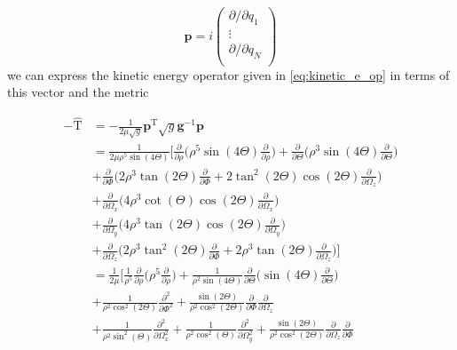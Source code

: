 \documentclass{article}
\numberwithin{equation}{section}
\numberwithin{figure}{section}
\begin{document}
\begin{equation}
\mathbf{p} = i 
\begin{pmatrix}
\partial/\partial q_1\\
\vdots\\
\partial/\partial q_N\\
\end{pmatrix}
\end{equation}
we can express the kinetic energy operator given in \eqref{eq:kinetic_e_op} in terms of this vector and the metric

\begin{equation}
\begin{aligned}
-\hat{\mathrm{T}} &= -\frac{1}{2\mu \sqrt{g}} \mathbf{p}^\mathrm{T} \sqrt{g} \mathbf{g}^{-1} \mathbf{p}\\
&= \frac{1}{2\mu \rho^5 \sin(4\Theta)}\Bigg[ \frac{\partial}{\partial \rho} \Bigg(\rho^5 \sin(4 \Theta) \frac{\partial}{\partial \rho}\Bigg) + \frac{\partial}{\partial \Theta}\Bigg(\rho^3\sin(4\Theta)\frac{\partial}{\partial\Theta}\Bigg)\\ &+\frac{\partial}{\partial\Phi}\Bigg(2\rho^3\tan(2\Theta)\frac{\partial}{\partial\Phi} + 2\tan^2(2\Theta)\cos(2\Theta)\frac{\partial}{\partial\Omega_z}\Bigg)\\
&+\frac{\partial}{\partial\Omega_x}\Bigg(4\rho^3\cot(\Theta)\cos(2\Theta)\frac{\partial}{\partial\Omega_x}\Bigg)\\
&+\frac{\partial}{\partial\Omega_y}\Bigg(4\rho^3\tan(2\Theta)\cos(2\Theta)\frac{\partial}{\partial\Omega_y}\Bigg)\\
&+\frac{\partial}{\partial\Omega_z}\Bigg(2\rho^3\tan^2(2\Theta)\frac{\partial}{\partial\Phi}+2\rho^3\tan(2\Theta)\frac{\partial}{\partial\Omega_z}\Bigg)\Bigg]\\
&=\frac{1}{2\mu}\Bigg[\frac{1}{\rho^5}\frac{\partial}{\partial\rho}\Bigg(\rho^5\frac{\partial}{\partial\rho}\Bigg) + \frac{1}{\rho^2\sin(4\Theta)}\frac{\partial}{\partial\Theta}\Bigg(\sin(4\Theta)\frac{\partial}{\partial\Theta}\Bigg)\\
&+\frac{1}{\rho^2\cos^2(2\Theta)}\frac{\partial^2}{\partial\Phi^2} + \frac{\sin(2\Theta)}{\rho^2\cos^2(2\Theta)}\frac{\partial}{\partial\Phi}\frac{\partial}{\partial\Omega_z}\\
&+\frac{1}{\rho^2\sin^2(\Theta)}\frac{\partial^2}{\partial\Omega^2_x} + \frac{1}{\rho^2\cos^2(\Theta)}\frac{\partial^2}{\partial\Omega^2_y} + \frac{\sin(2\Theta)}{\rho^2\cos^2(2\Theta)}\frac{\partial}{\partial\Omega_z}\frac{\partial}{\partial\Phi}\\

\end{aligned}
\end{equation}
\end{document}
